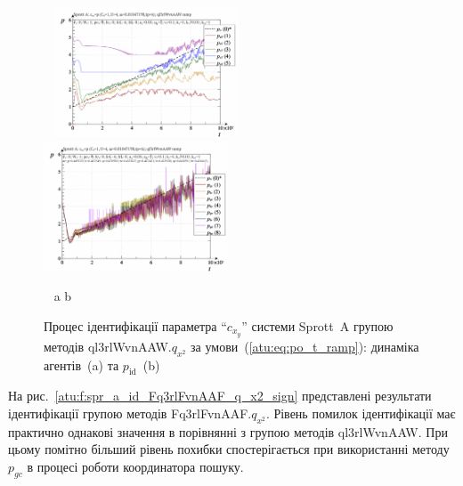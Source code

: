 \begin{figure}[htb!]
\begin{center}
  ~ \hfill
    \includegraphics[width=0.49\textwidth]{p/cha/spr_a/ql3rlWvnAAW_x2/sprott_a_id-p_t_pi_ql3rlWvnAAW_ramp.png}
    \hfill
    \includegraphics[width=0.49\textwidth]{p/cha/spr_a/ql3rlWvnAAW_x2/sprott_a_id-p_t_p_ql3rlWvnAAW_ramp.png}
  \hfill ~
\end{center}
  \vspace{-1.0ex}
  \begin{center}
    ~ \hfill a \hfill\hfill b \hfill ~
  \end{center}
\caption{Процес ідентифікації параметра ``$c_{x_y}$'' системи Sprott~A групою методів ql3rlWvnAAW.$q_{x^2}$ за умови~(\ref{atu:eq:po_t_ramp}): динаміка агентів~(a) та $p_\mathrm{id}$~(b)}
\label{atu:f:spr_a_id_ql3rlWvnAAW_q_x2_ramp}
\end{figure}

На рис.~\ref{atu:f:spr_a_id_Fq3rlFvnAAF_q_x2_sign} представлені результати
ідентифікації групою методів Fq3rlFvnAAF.$q_{x^2}$. Рівень помилок ідентифікації має практично однакові
значення в порівнянні з групою методів ql3rlWvnAAW. При цьому помітно
більший рівень похибки спостерігається при використанні методу
$p_{gc}$ в процесі роботи координатора пошуку.


